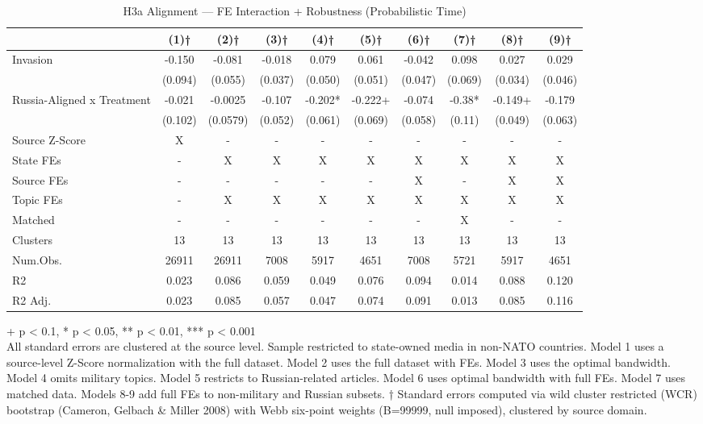\begin{table}[t]
\caption{\label{tab:s7}H3a Alignment — FE Interaction + Robustness (Probabilistic Time)}
\fontsize{12.0pt}{14.0pt}\selectfont
\begin{tabular*}{\linewidth}{@{\extracolsep{\fill}}lccccccccc}
\toprule
  & (1)† & (2)† & (3)† & (4)† & (5)† & (6)† & (7)† & (8)† & (9)† \\ 
\midrule\addlinespace[2.5pt]
Invasion & -0.150 & -0.081 & -0.018 & 0.079 & 0.061 & -0.042 & 0.098 & 0.027 & 0.029 \\ 
 & (0.094) & (0.055) & (0.037) & (0.050) & (0.051) & (0.047) & (0.069) & (0.034) & (0.046) \\ 
Russia-Aligned x Treatment & -0.021 & -0.0025 & -0.107 & -0.202* & -0.222+ & -0.074 & -0.38* & -0.149+ & -0.179 \\ 
{} & {(0.102)} & {(0.0579)} & {(0.052)} & {(0.061)} & {(0.069)} & {(0.058)} & {(0.11)} & {(0.049)} & {(0.063)} \\ 
Source Z-Score & X & - & - & - & - & - & - & - & - \\ 
State FEs & - & X & X & X & X & X & X & X & X \\ 
Source FEs & - & - & - & - & - & X & - & X & X \\ 
Topic FEs & - & X & X & X & X & X & X & X & X \\ 
Matched & - & - & - & - & - & - & X & - & - \\ 
Clusters & 13 & 13 & 13 & 13 & 13 & 13 & 13 & 13 & 13 \\ 
Num.Obs. & 26911 & 26911 & 7008 & 5917 & 4651 & 7008 & 5721 & 5917 & 4651 \\ 
R2 & 0.023 & 0.086 & 0.059 & 0.049 & 0.076 & 0.094 & 0.014 & 0.088 & 0.120 \\ 
R2 Adj. & 0.023 & 0.085 & 0.057 & 0.047 & 0.074 & 0.091 & 0.013 & 0.085 & 0.116 \\ 
\bottomrule
\end{tabular*}
\begin{minipage}{\linewidth}
\vspace{.05em}
+ p < 0.1, * p < 0.05, ** p < 0.01, *** p < 0.001\\
All standard errors are clustered at the source level. Sample restricted to
state-owned media in non-NATO countries. Model 1 uses a source-level Z-Score
normalization with the full dataset. Model 2 uses the full dataset with FEs.
Model 3 uses the optimal bandwidth. Model 4 omits military topics. Model 5
restricts to Russian-related articles. Model 6 uses optimal bandwidth with full
FEs. Model 7 uses matched data. Models 8-9 add full FEs to non-military and
Russian subsets. † Standard errors computed via wild cluster restricted (WCR)
bootstrap (Cameron, Gelbach \& Miller 2008) with Webb six-point weights (B=99999,
null imposed), clustered by source domain.\\
\end{minipage}
\end{table}

